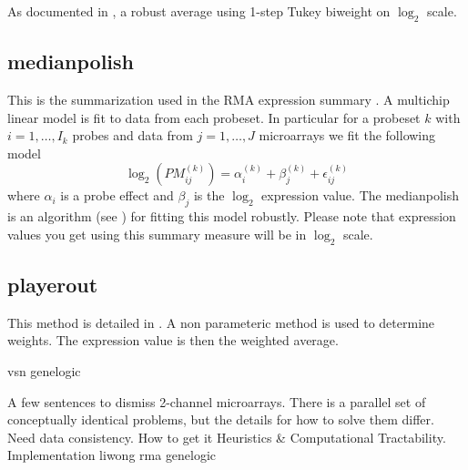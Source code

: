 As documented in \cite{affy:tech:2002}, a robust average using 1-step Tukey biweight on $\log_2$ scale.

\subsection{medianpolish}

This is the summarization used in the RMA expression summary \cite{PMID_12582260,PMID_12925520}. A multichip linear model is fit to data from each probeset. In particular for a probeset $k$ with $i=1,\dots,I_k$ probes and data from $j=1,\dots,J$ microarrays we fit the following model
\begin{equation*}
\log_2\left(PM^{(k)}_{ij}\right) = \alpha_i^{(k)} + \beta_j^{(k)} + \epsilon_{ij}^{(k)}
\end{equation*}
where $\alpha_i$ is a probe effect and $\beta_j$ is the $\log_2$ expression value. The medianpolish is an algorithm (see \cite{tukey:1977}) for fitting this model robustly. Please note that expression values you get using this summary measure will be in $\log_2$ scale.

\subsection{playerout}

This method is detailed in \cite{Lazardis:etal:2002}. A non parameteric method is used to determine weights. The expression value is then the weighted average.

vsn			\cite{PMID_12169536}
genelogic		\cite{PMID_17059591}

A few sentences to dismiss 2-channel microarrays.  There is a parallel set of conceptually identical problems, but the details for how to solve them differ.
Need data consistency.  How to get it
Heuristics \& Computational Tractability.  Implementation
liwong			\cite{PMID_11134512,PMID_11532216}
rma			\cite{PMID_12582260,PMID_12925520}
genelogic		\cite{PMID_17059591}

